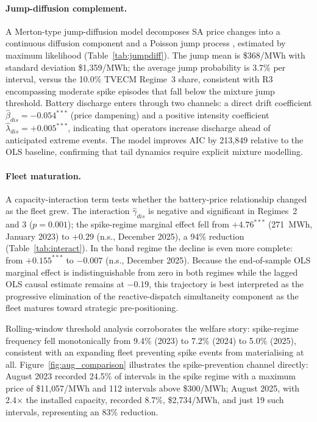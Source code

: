 \documentclass[12pt,a4paper]{article}
\begin{document}
\paragraph{Jump-diffusion complement.}
A Merton-type jump-diffusion model decomposes SA price changes into a continuous
diffusion component and a Poisson jump process \parencite{merton1976option}, estimated
by maximum likelihood (Table~\ref{tab:jumpdiff}).  The jump mean is
\$368/MWh with standard deviation \$1{,}359/MWh; the average jump probability is
3.7\% per interval, versus the 10.0\% TVECM Regime~3 share, consistent with R3
encompassing moderate spike episodes that fall below the mixture jump threshold.
Battery discharge enters through two channels: a direct drift coefficient
$\hat\beta_{dis} = -0.054^{***}$ (price dampening) and a positive intensity
coefficient $\hat\lambda_{dis} = +0.005^{***}$, indicating that operators increase
discharge ahead of anticipated extreme events.  The model improves AIC by 213{,}849
relative to the OLS baseline, confirming that tail dynamics require explicit
mixture modelling.

\paragraph{Fleet maturation.}
A capacity-interaction term tests whether the battery-price relationship
changed as the fleet grew.  The interaction $\hat\gamma_{dis}$ is negative and significant in Regimes~2
and 3 ($p = 0.001$); the spike-regime marginal effect fell from $+4.76^{***}$
(271~MWh, January 2023) to $+0.29$ (n.s., December 2025), a 94\% reduction
(Table~\ref{tab:interact}).  In the band regime the decline is
even more complete: from $+0.155^{***}$ to $-0.007$ (n.s., December 2025).
Because the end-of-sample OLS marginal effect is indistinguishable from zero in
both regimes while the lagged OLS causal estimate remains at $-0.19$, this
trajectory is best interpreted as the progressive elimination of the reactive-dispatch
simultaneity component as the fleet matures toward strategic pre-positioning.

Rolling-window threshold analysis corroborates the welfare story: spike-regime
frequency fell monotonically from 9.4\% (2023) to 7.2\% (2024) to 5.0\% (2025),
consistent with an expanding fleet preventing spike events from materialising
at all.  Figure~\ref{fig:aug_comparison} illustrates the spike-prevention channel
directly: August 2023 recorded 24.5\% of intervals in the spike regime with a
maximum price of \$11{,}057/MWh and 112 intervals above \$300/MWh; August 2025,
with 2.4$\times$ the installed capacity, recorded 8.7\%, \$2{,}734/MWh, and
just 19 such intervals, representing an 83\% reduction.
\end{document}
